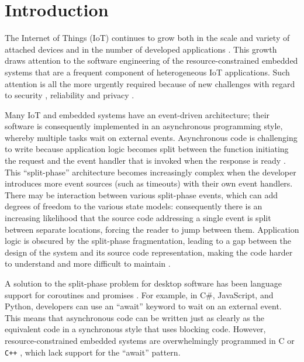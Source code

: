 \section{Introduction}


The Internet of Things (IoT) \cite{Al-Fuqaha2015, Atzori2010, Gubbi2013} continues to grow both in the scale and variety of attached devices and in the number of developed applications \cite{Manyika2015, VanderMeulen2017}. This growth draws attention to the software engineering of the resource-constrained embedded systems that are a frequent component of heterogeneous IoT applications. Such attention is all the more urgently required because of new challenges with regard to security \cite{Sicari2015}, reliability \cite{Gubbi2013} and privacy \cite{Weber2015}.

Many IoT and embedded systems have an event-driven architecture; their software is consequently implemented in an asynchronous programming style, whereby multiple tasks wait on external events. Asynchronous code is challenging to write because application logic becomes split between the function initiating the request and the event handler that is invoked when the response is ready \cite{Gay2003, Levis2002, Meijer2010}. This “split-phase” architecture becomes increasingly complex when the developer introduces more event sources (such as timeouts) with their own event handlers. There may be interaction between various split-phase events, which can add degrees of freedom to the various state models: consequently there is an increasing likelihood that the source code addressing a single event is split between separate locations, forcing the reader to jump between them. Application logic is obscured by the split-phase fragmentation, leading to a gap between the design of the system and its source code representation, making the code harder to understand and more difficult to maintain \cite{Brodu2015, Edwards2009, Madsen2017, Kambona2013}.

A solution to the split-phase problem for desktop software has been language support for coroutines \cite{Conway1963, Knuth1968, Marlin1979} and promises \cite{Brodu2015, Liskov1988, Madsen2017}. For example, in C\#, JavaScript, and Python, developers can use an “await” keyword to wait on an external event. This means that asynchronous code can be written just as clearly as the equivalent code in a synchronous style that uses blocking code. However, resource-constrained embedded systems are overwhelmingly programmed in C or \verb!C++! \cite{AspenCore2017, Skerrett2017}, which lack support for the “await” pattern.

